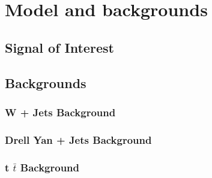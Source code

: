  \chapter{Model and backgrounds}

 \section{Signal of Interest}
 
 \section{Backgrounds}
 
 \subsection{W + Jets Background}
  
 \subsection{Drell Yan + Jets Background}
 
 \subsection{t $\bar{t}$ Background}
 
 